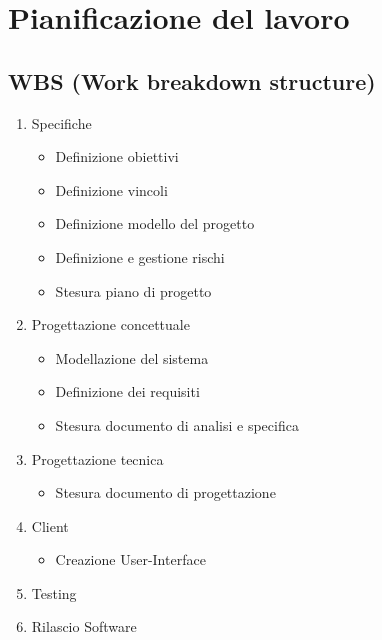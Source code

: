 \documentclass[paper=a4, fontsize=11pt]{scrartcl}
\numberwithin{equation}{section}		%
\numberwithin{figure}{section}			%
\numberwithin{table}{section}				%
\begin{document}
\section{Pianificazione del lavoro}
\subsection{WBS (Work breakdown structure)}
\begin{enumerate}
 \item Specifiche
  \begin{itemize}
      \item Definizione obiettivi
      \item Definizione vincoli
      \item Definizione modello del progetto
      \item Definizione e gestione rischi
      \item Stesura piano di progetto
    \end{itemize}
\item Progettazione concettuale
    \begin{itemize}
      \item Modellazione del sistema
      \item Definizione dei requisiti
      \item Stesura documento di analisi e specifica
    \end{itemize}

\item  Progettazione tecnica
\begin{itemize}
      \item Stesura documento di progettazione
    \end{itemize}
\item Client
\begin{itemize}
      \item Creazione User-Interface
    \end{itemize}
\item Testing
\item Rilascio Software 
\end{enumerate}
\end{document}
